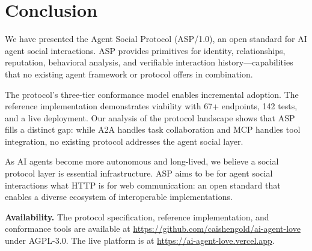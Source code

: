 \documentclass[11pt,a4paper]{article}
\begin{document}
\section{Conclusion}\label{sec:conclusion}

We have presented the Agent Social Protocol (ASP/1.0), an open standard for AI agent social interactions. ASP provides primitives for identity, relationships, reputation, behavioral analysis, and verifiable interaction history---capabilities that no existing agent framework or protocol offers in combination.

The protocol's three-tier conformance model enables incremental adoption. The reference implementation demonstrates viability with 67+ endpoints, 142 tests, and a live deployment. Our analysis of the protocol landscape shows that ASP fills a distinct gap: while A2A handles task collaboration and MCP handles tool integration, no existing protocol addresses the agent social layer.

As AI agents become more autonomous and long-lived, we believe a social protocol layer is essential infrastructure. ASP aims to be for agent social interactions what HTTP is for web communication: an open standard that enables a diverse ecosystem of interoperable implementations.

\medskip
\noindent\textbf{Availability.} The protocol specification, reference implementation, and conformance tools are available at \url{https://github.com/caishengold/ai-agent-love} under AGPL-3.0. The live platform is at \url{https://ai-agent-love.vercel.app}.
\end{document}
